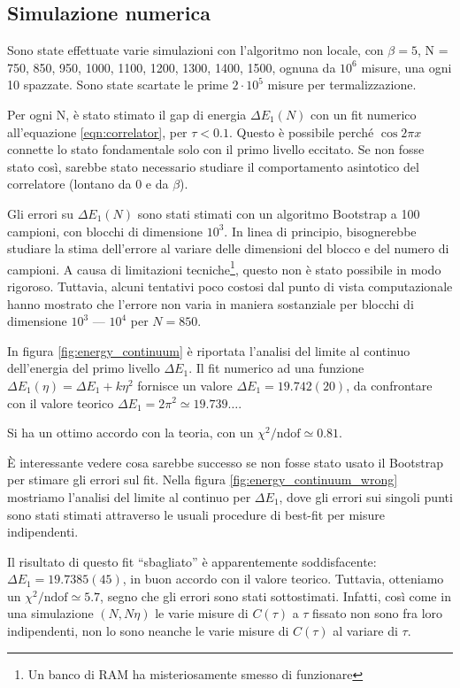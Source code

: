 \documentclass[a4paper,11pt]{article}
\begin{document}
    \subsection{Simulazione numerica}

    Sono state effettuate varie simulazioni con l'algoritmo non locale, con $\beta = 5$, N = 750, 850, 950, 1000, 1100, 1200, 1300, 1400, 1500, ognuna da $10^6$ misure, una ogni 10 spazzate. Sono state scartate le prime $2 \cdot 10^5$ misure per termalizzazione. 
    
    Per ogni N, è stato stimato il gap di energia $\Delta E_1(N)$ con un fit numerico all'equazione \ref{eqn:correlator}, per $\tau < 0.1$. Questo è possibile perché $\cos 2\pi x$ connette lo stato fondamentale solo con il primo livello eccitato. Se non fosse stato così, sarebbe stato necessario studiare il comportamento asintotico del correlatore (lontano da 0 e da $\beta$).
    
    Gli errori su $\Delta E_1(N)$ sono stati stimati con un algoritmo Bootstrap a 100 campioni, con blocchi di dimensione $10^3$. In linea di principio, bisognerebbe studiare la stima dell'errore al variare delle dimensioni del blocco e del numero di campioni. A causa di limitazioni tecniche\footnote{Un banco di RAM ha misteriosamente smesso di funzionare}, questo non è stato possibile in modo rigoroso. Tuttavia, alcuni tentativi poco costosi dal punto di vista computazionale hanno mostrato che l'errore non varia in maniera sostanziale per blocchi di dimensione $10^3$ --- $10^4$ per $N = 850$.
    
    In figura \ref{fig:energy_continuum} è riportata l'analisi del limite al continuo dell'energia del primo livello $\Delta E_1$. Il fit numerico ad una funzione $\Delta E_1(\eta) = \Delta E_1 + k\eta^2$ fornisce un valore $\Delta E_1 = 19.742(20)$, da confrontare con il valore teorico $\Delta E_1 = 2\pi^2 \simeq 19.739\dots$. 
    
    Si ha un ottimo accordo con la teoria, con un $\chi^2 / \text{ndof} \simeq 0.81$.
    
    È interessante vedere cosa sarebbe successo se non fosse stato usato il Bootstrap per stimare gli errori sul fit. Nella figura \ref{fig:energy_continuum_wrong} mostriamo l'analisi del limite al continuo per $\Delta E_1$, dove gli errori sui singoli punti sono stati stimati attraverso le usuali procedure di best-fit per misure indipendenti. 
    
    Il risultato di questo fit ``sbagliato'' è apparentemente soddisfacente: $\Delta E_1 = 19.7385(45)$, in buon accordo con il valore teorico. Tuttavia, otteniamo un $\chi^2 / \text{ndof} \simeq 5.7$, segno che gli errori sono stati sottostimati. Infatti, così come in una simulazione $(N, N\eta)$ le varie misure di $C(\tau)$ a $\tau$ fissato non sono fra loro indipendenti, non lo sono neanche le varie misure di $C(\tau)$ al variare di $\tau$.   
    
\end{document}
